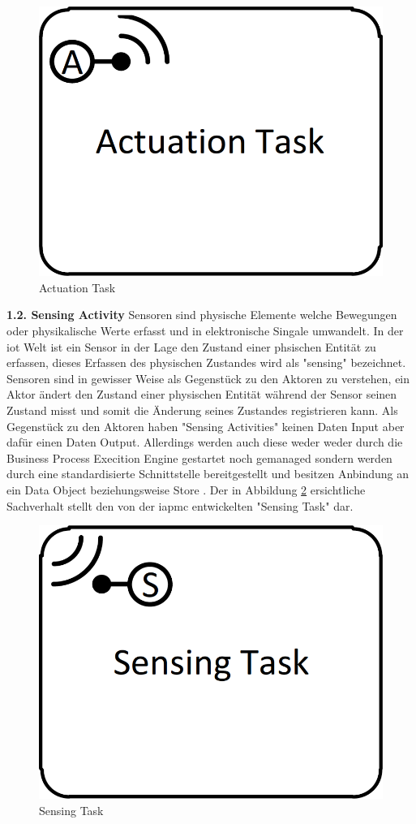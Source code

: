 \documentclass[a4paper, 12pt, twoside, headsepline=true]{scrartcl} %
\begin{document}
\begin{figure}[H]
	\includegraphics[height=2 cm,keepaspectratio,center]{figures/ActuationTask}
	\caption{Actuation Task \cite[S.44]{conceptsiotawarepm}}
	\label{fig:actuationtask}
\end{figure} 

\textbf{1.2. Sensing Activity}
\newline
Sensoren sind physische Elemente welche Bewegungen oder physikalische Werte erfasst und in elektronische Singale umwandelt. In der \ac{iot} Welt ist ein Sensor in der Lage den Zustand einer phsischen Entität zu erfassen, dieses Erfassen des physischen Zustandes wird als "sensing" bezeichnet.\\
Sensoren sind in gewisser Weise als Gegenstück zu den Aktoren zu verstehen, ein Aktor ändert den Zustand einer physischen Entität während der Sensor seinen Zustand misst und somit die Änderung seines Zustandes registrieren kann. Als Gegenstück zu den Aktoren haben "Sensing Activities" keinen Daten Input aber dafür einen Daten Output. Allerdings werden auch diese weder weder durch die Business Process Execition Engine gestartet noch gemanaged sondern werden durch eine standardisierte Schnittstelle bereitgestellt und besitzen Anbindung an ein Data Object beziehungsweise Store \cite[S.45]{conceptsiotawarepm}. Der in Abbildung \ref{fig:sensingtask} ersichtliche Sachverhalt stellt den von der \ac{iapmc} entwickelten "Sensing Task" dar.

\begin{figure}[H]
	\includegraphics[height=2 cm,keepaspectratio,center]{figures/SensingTask}
	\caption{Sensing Task \cite[S.49]{conceptsiotawarepm}}
	\label{fig:sensingtask}
\end{figure} 
\end{document}
